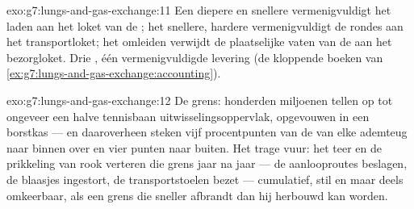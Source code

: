 \begin{solution}{exo:g7:lungs-and-gas-exchange:11}
Een diepere en snellere  vermenigvuldigt het laden aan het
loket van de ; het snellere, hardere  vermenigvuldigt de
rondes aan het transportloket; het omleiden verwijdt de plaatselijke
vaten van de  aan het bezorgloket. Drie , één
vermenigvuldigde levering (de kloppende boeken van
\cref{ex:g7:lungs-and-gas-exchange:accounting}).
\end{solution}

\begin{solution}{exo:g7:lungs-and-gas-exchange:12}
De grens: honderden miljoenen  tellen op tot ongeveer een
halve tennisbaan uitwisselingsoppervlak, opgevouwen in een borstkas ---
en daaroverheen steken vijf procentpunten van de  van elke
ademteug naar binnen over en vier punten  naar buiten. Het
trage vuur: het teer en de prikkeling van rook verteren die grens jaar na
jaar --- de aanlooproutes beslagen, de blaasjes ingestort, de
transportstoelen bezet --- cumulatief, stil en maar deels omkeerbaar, als
een grens die sneller afbrandt dan hij herbouwd kan worden.
\end{solution}

